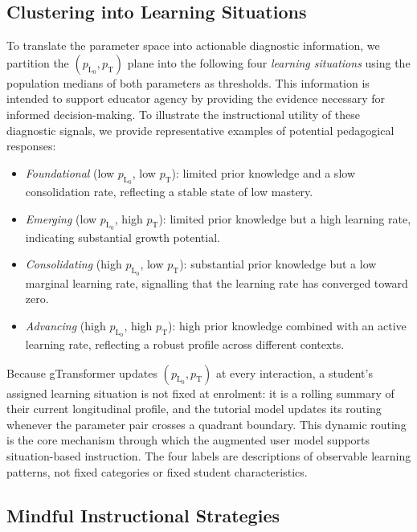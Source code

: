 \documentclass[runningheads]{llncs}
\begin{document}
\subsection{Clustering into Learning Situations}
\label{sec_situations}

To translate the parameter space into actionable diagnostic information, we partition the $(p_{\text{L}_0}, p_{\text{T}})$ plane into the following four \textit{learning situations} using the population medians of both parameters as thresholds. This information is intended to support educator agency by providing the evidence necessary for informed decision-making. To illustrate the instructional utility of these diagnostic signals, we provide representative examples of potential pedagogical responses:

\begin{itemize}
    \item \textit{Foundational} (low $p_{\text{L}_0}$, low $p_{\text{T}}$): limited prior knowledge and a slow consolidation rate, reflecting a stable state of low mastery.
    \item \textit{Emerging} (low $p_{\text{L}_0}$, high $p_{\text{T}}$): limited prior knowledge but a high learning rate, indicating substantial growth potential.
    \item \textit{Consolidating} (high $p_{\text{L}_0}$, low $p_{\text{T}}$): substantial prior knowledge but a low marginal learning rate, signalling that the learning rate has converged toward zero.
    \item \textit{Advancing} (high $p_{\text{L}_0}$, high $p_{\text{T}}$): high prior knowledge combined with an active learning rate, reflecting a robust profile across different contexts.
\end{itemize}

Because gTransformer updates $(p_{\text{L}_0}, p_{\text{T}})$ at every interaction, a student's assigned learning situation is not fixed at enrolment: it is a rolling summary of their current longitudinal profile, and the tutorial model updates its routing whenever the parameter pair crosses a quadrant boundary. This dynamic routing is the core mechanism through which the augmented user model supports situation-based instruction. The four labels are descriptions of observable learning patterns, not fixed categories or fixed student characteristics.

%
\subsection{Mindful Instructional Strategies}
\label{sec_strategies}
\end{document}
